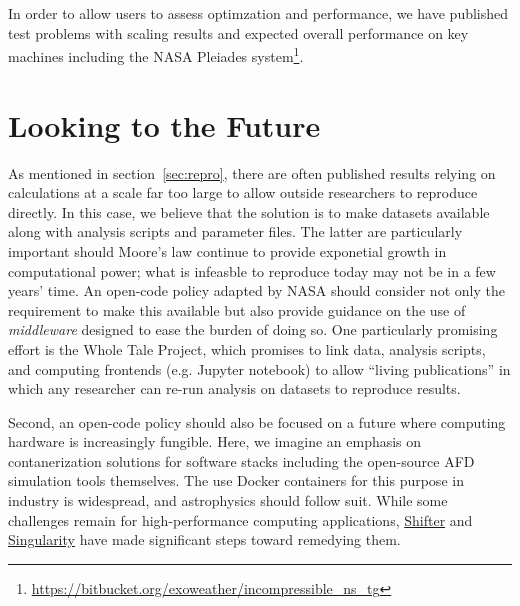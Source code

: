 \documentclass[12pt, titlepage]{aastex62}
\begin{document}
In order to allow users to assess optimzation and performance, we have published test problems with scaling results and expected overall performance on key machines including the NASA Pleiades system\footnote{\url{https://bitbucket.org/exoweather/incompressible_ns_tg}}. 

\section{Looking to the Future}
\label{sec:future}

As mentioned in section~\ref{sec:repro}, there are often published results relying on calculations at a scale far too large to allow outside researchers to reproduce directly. In this case, we believe that the solution is to make datasets available along with analysis scripts and parameter files. The latter are particularly important should Moore's law continue to provide exponetial growth in computational power; what is infeasble to reproduce today may not be in a few years' time. An open-code policy adapted by NASA should consider not only the requirement to make this available but also provide guidance on the use of \emph{middleware} designed to ease the burden of doing so. One particularly promising effort is the Whole Tale Project, which promises to link data, analysis scripts, and computing frontends (e.g. Jupyter notebook) to allow ``living publications'' in which any researcher can re-run analysis on datasets to reproduce results. 

Second, an open-code policy should also be focused on a future where computing hardware is increasingly fungible. Here, we imagine an emphasis on contanerization solutions for software stacks including the open-source AFD simulation tools themselves. The use Docker containers for this purpose in industry is widespread, and astrophysics should follow suit. While some challenges remain for high-performance computing applications, \href{https://github.com/NERSC/shifter}{Shifter} and \href{http://singularity.lbl.gov/}{Singularity} have made significant steps toward remedying them. 

\end{document}
